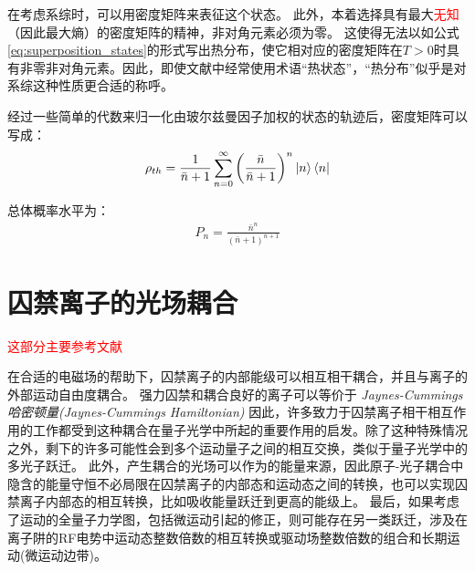 在考虑系综时，可以用密度矩阵来表征这个状态。
此外，本着选择具有最大\textcolor{red}{无知}（因此最大熵）的密度矩阵的精神，非对角元素必须为零。
这使得无法以如公式\eqref{eq:superposition_states}的形式写出热分布，使它相对应的密度矩阵在$T>0$时具有非零非对角元素。因此，即使文献中经常使用术语“热状态”，“热分布”似乎是对系综这种性质更合适的称呼。

经过一些简单的代数来归一化由玻尔兹曼因子加权的状态的轨迹后，密度矩阵可以写成：
\begin{align}
    \rho_{th}=\frac{1}{\bar{n}+1}\sum_{n=0}^{\infty}\left(\frac{\bar{n}}{\bar{n}+1}\right)^n\ket{n}\bra{n}
\end{align}

总体概率水平为：
\begin{align}
    P_n=\frac{\bar{n}^n}{(\bar{n}+1)^{n+1}}
\end{align}







\section[囚禁离子的光场耦合]{囚禁离子的光场耦合}
\textcolor{red}{这部分主要参考文献\cite[p3-8]{Leibfried_Blatt_Monroe_Wineland_2003}}

在合适的电磁场的帮助下，囚禁离子的内部能级可以相互相干耦合，并且与离子的外部运动自由度耦合。
强力囚禁和耦合良好的离子可以等价于
\emph{Jaynes-Cummings 哈密顿量(Jaynes-Cummings Hamiltonian)}\cite[]{Janszky_Yushin_1986}
因此，许多致力于囚禁离子相干相互作用的工作都受到这种耦合在量子光学中所起的重要作用的启发。除了这种特殊情况之外，剩下的许多可能性会到多个运动量子之间的相互交换，类似于量子光学中的多光子跃迁。
此外，产生耦合的光场可以作为的能量来源，因此原子-光子耦合中隐含的能量守恒不必局限在囚禁离子的内部态和运动态之间的转换，也可以实现囚禁离子内部态的相互转换，比如吸收能量跃迁到更高的能级上。
最后，如果考虑了运动的全量子力学图，包括微运动引起的修正，则可能存在另一类跃迁，涉及在离子阱的RF电势中运动态整数倍数的相互转换或驱动场整数倍数的组合和长期运动(微运动边带)。


